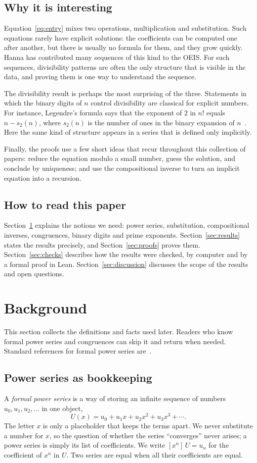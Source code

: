 \documentclass[11pt,a4paper]{article}
\theoremstyle{definition}
\theoremstyle{remark}
\newcommand{\coeff}[2]{[x^{#1}]\,#2}
\begin{document}
\subsection{Why it is interesting}
Equation~\eqref{eq:entry} mixes two operations, multiplication and substitution. Such equations rarely have explicit
solutions: the coefficients can be computed one after another, but there is usually no formula for them, and they grow
quickly. Hanna has contributed many sequences of this kind to the OEIS. For such sequences, divisibility patterns are
often the only structure that is visible in the data, and proving them is one way to understand the sequence.

The divisibility result is perhaps the most surprising of the three. Statements in which the binary digits of $n$
control divisibility are classical for explicit numbers. For instance, Legendre's formula says that the exponent of $2$
in $n!$ equals $n-s_2(n)$, where $s_2(n)$ is the number of ones in the binary expansion of $n$~\cite{concrete}.
Here the same kind of structure appears in a series that is defined only implicitly.

Finally, the proofs use a few short ideas that recur throughout this collection of papers: reduce the equation modulo
a small number, guess the solution, and conclude by uniqueness; and use the compositional inverse to turn an implicit
equation into a recursion.

\subsection{How to read this paper}
Section~\ref{sec:background} explains the notions we need: power series, substitution, compositional inverses,
congruences, binary digits and prime exponents. Section~\ref{sec:results} states the results precisely, and
Section~\ref{sec:proofs} proves them. Section~\ref{sec:checks} describes how the results were checked, by computer and by
a formal proof in Lean. Section~\ref{sec:discussion} discusses the scope of the results and open questions.
\section{Background}\label{sec:background}
This section collects the definitions and facts used later. Readers who know formal power series and congruences can skip it and return when needed. Standard references for formal power series are~\cite{niven,stanley}.
\subsection{Power series as bookkeeping}
A \emph{formal power series} is a way of storing an infinite sequence of numbers $u_0,u_1,u_2,\dots$ in one object,
\[
U(x)=u_0+u_1x+u_2x^2+u_3x^3+\cdots .
\]
The letter $x$ is only a placeholder that keeps the terms apart. We never substitute a number for $x$, so the question
of whether the series ``converges'' never arises; a power series is simply its list of coefficients. We write
$\coeff{n}{U}=u_n$ for the coefficient of $x^n$ in $U$. Two series are equal when all their coefficients are equal.
\end{document}
